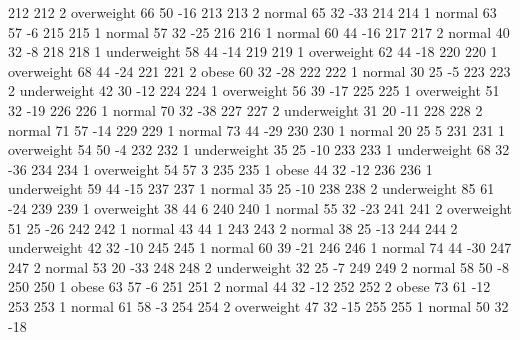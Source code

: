 \begin{Schunk}
\begin{Soutput}
212         212   2  overweight  66         50          -16
213         213   2      normal  65         32          -33
214         214   1      normal  63         57           -6
215         215   1      normal  57         32          -25
216         216   1      normal  60         44          -16
217         217   2      normal  40         32           -8
218         218   1 underweight  58         44          -14
219         219   1  overweight  62         44          -18
220         220   1  overweight  68         44          -24
221         221   2       obese  60         32          -28
222         222   1      normal  30         25           -5
223         223   2 underweight  42         30          -12
224         224   1  overweight  56         39          -17
225         225   1  overweight  51         32          -19
226         226   1      normal  70         32          -38
227         227   2 underweight  31         20          -11
228         228   2      normal  71         57          -14
229         229   1      normal  73         44          -29
230         230   1      normal  20         25            5
231         231   1  overweight  54         50           -4
232         232   1 underweight  35         25          -10
233         233   1 underweight  68         32          -36
234         234   1  overweight  54         57            3
235         235   1       obese  44         32          -12
236         236   1 underweight  59         44          -15
237         237   1      normal  35         25          -10
238         238   2 underweight  85         61          -24
239         239   1  overweight  38         44            6
240         240   1      normal  55         32          -23
241         241   2  overweight  51         25          -26
242         242   1      normal  43         44            1
243         243   2      normal  38         25          -13
244         244   2 underweight  42         32          -10
245         245   1      normal  60         39          -21
246         246   1      normal  74         44          -30
247         247   2      normal  53         20          -33
248         248   2 underweight  32         25           -7
249         249   2      normal  58         50           -8
250         250   1       obese  63         57           -6
251         251   2      normal  44         32          -12
252         252   2       obese  73         61          -12
253         253   1      normal  61         58           -3
254         254   2  overweight  47         32          -15
255         255   1      normal  50         32          -18

\end{Soutput}
\end{Schunk}
